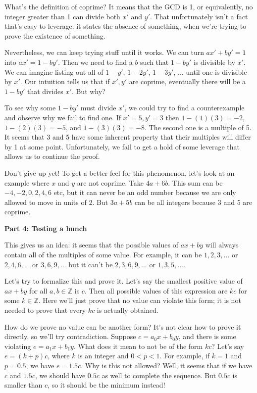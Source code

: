 \documentclass[11pt]{article}
\begin{document}
    What's the definition of coprime? It means that the GCD is 1, or equivalently,
    no integer greater than 1 can divide both $x'$ and $y'$. That unfortunately isn't
    a fact that's easy to leverage: it states the absence of something, when we're trying
    to prove the existence of something.
    
    Nevertheless, we can keep trying stuff until it works. We can turn $ax'+by'=1$
    into $ax'=1-by'$. Then we need to find a $b$ such that $1-by'$ is divisible by $x'$.
    We can imagine listing out all of $1-y'$, $1-2y'$, $1-3y'$, ... until one is divisible
    by $x'$. Our intuition tells us that if $x',y'$ are coprime, eventually there will be
    a $1-by'$ that divides $x'$. But why?
    
    To see why some $1-by'$ must divide $x'$, we could try to find a counterexample and
    observe why we fail to find one. If $x'=5,y'=3$ then $1-(1)(3)=-2$, $1-(2)(3)=-5$,
    and $1-(3)(3)=-8$. The second one is a multiple of 5. It seems that 3 and 5 have
    some inherent property that their multiples will differ by 1 at some point.
    Unfortunately, we fail to get a hold of some leverage that allows us to continue
    the proof.
    
    Don't give up yet! To get a better feel for this phenomenon, let's look at an
    example where $x$ and $y$ are not coprime. Take $4a+6b$. This sum can be
    $-4,-2,0,2,4,6$ etc, but it can never be an odd number because we are only allowed
    to move in units of 2. But $3a+5b$ can be all integers because 3 and 5 are coprime.
    
    \textbf{Part 4: Testing a hunch}
    
    This gives us an idea: it seems that the possible values of $ax+by$ will always 
    contain all of the multiples of some value. For example, it can be $1,2,3,...$ or
    $2,4,6,...$ or $3,6,9,...$ but it can't be $2,3,6,9,...$ or $1,3,5,...$.
    
    Let's try to formalize this and prove it. Let's say the smallest positive value of
    $ax+by$ for all $a,b\in\mathbb Z$ is $c$. Then all possible values of this expression
    are $kc$ for some $k\in\mathbb Z$. Here we'll just prove that no value can violate
    this form; it is not needed to prove that every $kc$ is actually obtained.
    
    How do we prove no value can be another form? It's not clear how to prove it directly,
    so we'll try contradiction. Suppose $c=a_0x+b_0y$, and there is some violating
    $e=a_1x+b_1y$. What does it mean to not be of the form $kc$? Let's say
    $e=(k+p)c$, where $k$ is an integer and $0<p<1$. For example, if $k=1$ and $p=0.5$,
    we have $e=1.5c$. Why is this not allowed? Well, it seems that if we have $c$ and 
    $1.5c$, we should have $0.5c$ as well to complete the sequence. But $0.5c$ is smaller
    than $c$, so it should be the minimum instead!
    
\end{document}
